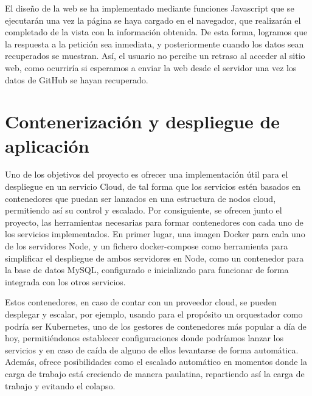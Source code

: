 
El diseño de la web se ha implementado mediante funciones Javascript que se
ejecutarán una vez la página se haya cargado en el navegador, que
realizarán el completado de la vista con la información obtenida. De esta
forma, logramos que la respuesta a la petición sea inmediata, y
posteriormente cuando los datos sean recuperados se muestran. Así, el
usuario no percibe un retraso al acceder al sitio web, como ocurriría si
esperamos a enviar la web desde el servidor una vez los datos de GitHub se
hayan recuperado.

\section{Contenerización y despliegue de aplicación}

Uno de los objetivos del proyecto es ofrecer una implementación útil para
el despliegue en un servicio Cloud, de tal forma que los servicios estén
basados en contenedores que puedan ser lanzados en una estructura de nodos
cloud, permitiendo así su control y escalado. Por consiguiente, se ofrecen
junto el proyecto, las herramientas necesarias para formar contenedores con
cada uno de los servicios implementados. En primer lugar, una imagen Docker
para cada uno de los servidores Node, y un fichero docker-compose como
herramienta para simplificar el despliegue de ambos servidores en
Node, como un contenedor para la base de datos MySQL, configurado e
inicializado para funcionar de forma integrada con los otros servicios.

Estos contenedores, en caso de contar con un proveedor cloud, se pueden
desplegar y escalar, por ejemplo, usando para el propósito un orquestador
como podría ser Kubernetes, uno de los gestores de contenedores más popular
a día de hoy, permitiéndonos establecer configuraciones donde podríamos
lanzar los servicios y en caso de caída de alguno de ellos levantarse de
forma automática. Además, ofrece posibilidades como el escalado automático
en momentos donde la carga de trabajo está creciendo de manera paulatina,
repartiendo así la carga de trabajo y evitando el colapso.

